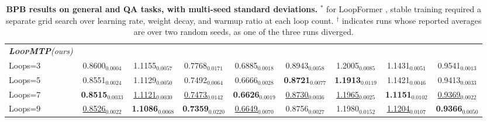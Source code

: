 \begin{table}[t]
{\begin{tabular}{
        l |
        c c c c c c c c
        }
        \rowcolor{lightgray} \textit{\textbf{\textsc{LoopMTP}}\small(ours)\normalsize} &&&&&&&&\\
        \rowcolor{lightgray} \quad Loops=3 & 0.8600$_{0.0004}$ & 1.1155$_{0.0057}$ & 0.7768$_{0.0171}$ & 0.6885$_{0.0018}$ & 0.8943$_{0.0058}$ & 1.2005$_{0.0085}$ & 1.1431$_{0.0051}$ & 0.9541$_{0.0013}$\\
        \rowcolor{lightgray} \quad Loops=5 & 0.8551$_{0.0024}$ & 1.1129$_{0.0050}$ & 0.7492$_{0.0064}$ & 0.6666$_{0.0028}$ & \textbf{0.8721$_{0.0077}$} & \textbf{1.1913$_{0.0119}$} & 1.1421$_{0.0046}$ & 0.9413$_{0.0033}$\\
        \rowcolor{lightgray} \quad Loops=7 & \textbf{0.8515$_{0.0033}$} & \underline{1.1121}$_{0.0030}$ & \underline{0.7473}$_{0.0142}$ & \textbf{0.6626}$_{0.0019}$ & \underline{0.8730}$_{0.0036}$ & \underline{1.1965}$_{0.0025}$ & \textbf{1.1151$_{0.0102}$} & \underline{0.9369}$_{0.0022}$\\
        \rowcolor{lightgray} \quad Loops=9 & \underline{0.8526}$_{0.0022}$ & \textbf{1.1086$_{0.0068}$} & \textbf{0.7359$_{0.0220}$} & \underline{0.6649}$_{0.0070}$ & 0.8756$_{0.0027}$ & 1.1980$_{0.0152}$ & \underline{1.1204}$_{0.0107}$ & \textbf{0.9366$_{0.0050}$}\\
    \bottomrule
    \end{tabular}
    }
    \caption{\textbf{BPB results on general and QA tasks, with multi-seed standard deviations.}
    $^*$ for LoopFormer \cite{jeddi2026loopformer}, stable training required a separate grid search over learning rate, weight decay, and warmup ratio at each loop count. $^\dagger$ indicates runs whose reported averages are over two random seeds, as one of the three runs diverged.}
    \label{tab:bpb_general_results}
\end{table}



